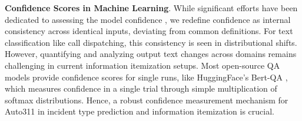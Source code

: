 
\noindent\textbf{Confidence Scores in Machine Learning}. 
While significant efforts have been dedicated to assessing the model confidence \cite{poggi2017quantitative, hullermeier2021aleatoric, poggi2016learning}, we redefine confidence as internal consistency across identical inputs, deviating from common definitions. For text classification like call dispatching, this consistency is seen in distributional shifts. However, quantifying and analyzing output text changes across domains remains challenging in current information itemization setups. Most open-source QA models provide confidence scores for single runs, like HuggingFace's Bert-QA \cite{huggingface_bert_qa_2022}, which measures confidence in a single trial through simple multiplication of softmax distributions. Hence, a robust confidence measurement mechanism for Auto311 in incident type prediction and information itemization is crucial.


